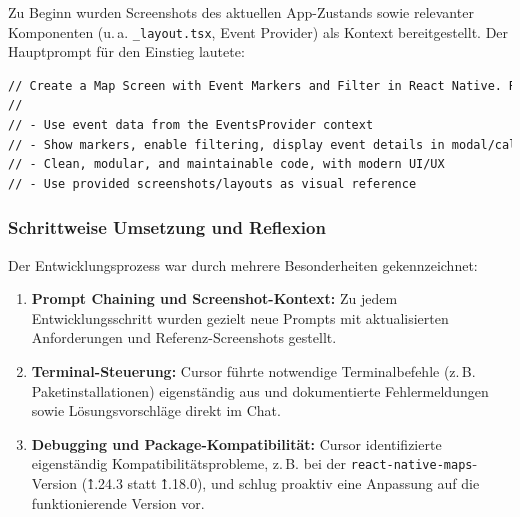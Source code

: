Zu Beginn wurden Screenshots des aktuellen App-Zustands sowie relevanter
Komponenten (u.\,a. \texttt{\_layout.tsx}, Event Provider) als Kontext
bereitgestellt. Der Hauptprompt für den Einstieg lautete:

\begin{lstlisting}[language=HTML]
// Create a Map Screen with Event Markers and Filter in React Native. Requirements:
//
// - Use event data from the EventsProvider context
// - Show markers, enable filtering, display event details in modal/callout
// - Clean, modular, and maintainable code, with modern UI/UX 
// - Use provided screenshots/layouts as visual reference
\end{lstlisting}

\subsubsection{Schrittweise Umsetzung und Reflexion}

Der Entwicklungsprozess war durch mehrere Besonderheiten gekennzeichnet:

\begin{enumerate}
      \item \textbf{Prompt Chaining und Screenshot-Kontext:} Zu jedem Entwicklungsschritt wurden gezielt neue Prompts mit aktualisierten Anforderungen und Referenz-Screenshots gestellt.
      \item \textbf{Terminal-Steuerung:} Cursor führte notwendige Terminalbefehle (z.\,B. Paketinstallationen) eigenständig aus und dokumentierte Fehlermeldungen sowie Lösungsvorschläge direkt im Chat.
      \item \textbf{Debugging und Package-Kompatibilität:} Cursor identifizierte eigenständig Kompatibilitätsprobleme, z.\,B. bei der \texttt{react-native-maps}-Version (\^1.24.3 statt \^1.18.0), und schlug proaktiv eine Anpassung auf die funktionierende Version vor.
\end{enumerate}

